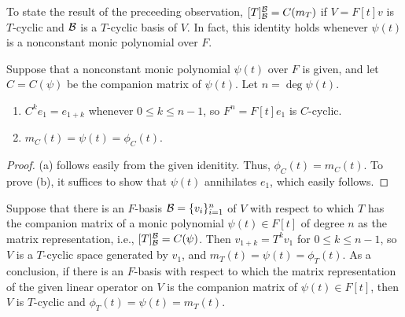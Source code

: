 To state the result of the preceeding observation, $[T]^{\mathcal{B}}_{\mathcal{B}}=C(m_T)$ if $V=F[t]v$ is $T$-cyclic and ${\mathcal{B}}$ is a $T$-cyclic basis of $V$.
In fact, this identity holds whenever $\psi(t)$ is a nonconstant monic polynomial over $F$.
\begin{prop}
    Suppose that a nonconstant monic polynomial $\psi(t)$ over $F$ is given, and let $C=C(\psi)$ be the companion matrix of $\psi(t)$.
    Let $n=\deg\psi(t)$.
    \begin{enumerate}
        \item[(a)]
        {
            $C^ke_1=e_{1+k}$ whenever $0\leq k\leq n-1$, so $F^n=F[t]e_1$ is $C$-cyclic.
        }
        \item[(b)]
        {
            $m_C(t)=\psi(t)=\phi_C(t)$.
        }
    \end{enumerate}
\end{prop}
\begin{proof}
    (a) follows easily from the given idenitity.
    Thus, $\phi_C(t)=m_C(t)$.
    To prove (b), it suffices to show that $\psi(t)$ annihilates $e_1$, which easily follows.
\end{proof}
\begin{rmk}
    Suppose that there is an $F$-basis ${\mathcal{B}}=\{v_i\}_{i=1}^n$ of $V$ with respect to which $T$ has the companion matrix of a monic polynomial $\psi(t)\in F[t]$ of degree $n$ as the matrix representation, i.e., $[T]^{\mathcal{B}}_{\mathcal{B}}=C(\psi)$.
    Then $v_{1+k}=T^kv_1$ for $0\leq k\leq n-1$, so $V$ is a $T$-cyclic space generated by $v_1$, and $m_T(t)=\psi(t)=\phi_T(t)$.
    As a conclusion, if there is an $F$-basis with respect to which the matrix representation of the given linear operator on $V$ is the companion matrix of $\psi(t)\in F[t]$, then $V$ is $T$-cyclic and $\phi_T(t)=\psi(t)=m_T(t)$.
\end{rmk}

